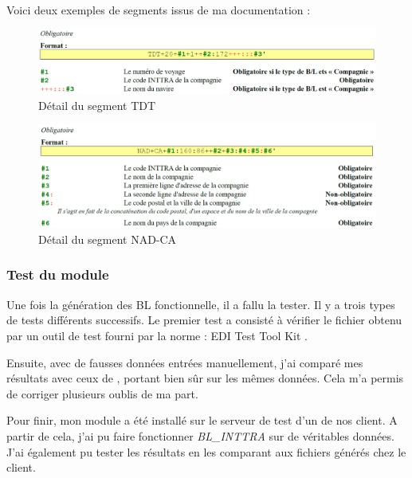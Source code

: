 Voici deux exemples de segments issus de ma documentation :
\begin{figure}[h!]
	\begin{center}
		\includegraphics[scale=.54]{Contenu/Synthese_SeptembreAvril/Images/Segment_TDT.png}
	\end{center}

	\caption{Détail du segment \og TDT \fg}
	\label{segment_TDT}
\end{figure}
\begin{figure}[h!]
	\begin{center}
		\includegraphics[scale=.54]{Contenu/Synthese_SeptembreAvril/Images/Segment_NAD_CA.png}
	\end{center}

	\caption{Détail du segment \og NAD-CA \fg}
	\label{segment_NAD_CA}
\end{figure}

\subsubsection{Test du module}
Une fois la génération des BL fonctionnelle, il a fallu la tester. Il y a trois types de tests différents successifs. Le premier test a consisté à vérifier le fichier obtenu par un outil de test fourni par la norme : \og EDI Test Tool Kit \fg.

Ensuite, avec de fausses données entrées manuellement, j'ai comparé mes résultats avec ceux de \pireus, portant bien sûr sur les mêmes données. Cela m'a permis de corriger plusieurs oublis de ma part.

Pour finir, mon module a été installé sur le serveur de test d'un de nos client. A partir de cela, j'ai pu faire fonctionner \emph{BL\_INTTRA} sur de véritables données. J'ai également pu tester les résultats en les comparant aux fichiers générés chez le client.

